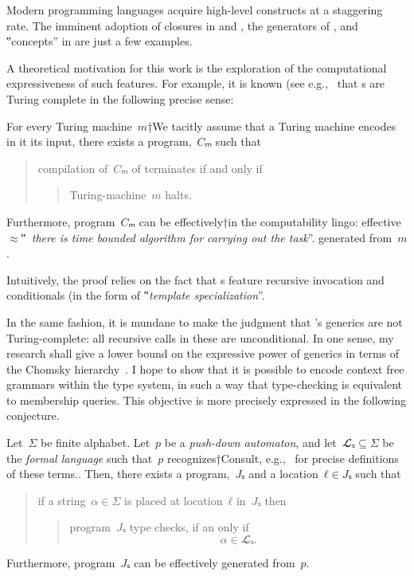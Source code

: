 Modern programming languages acquire high-level constructs
  at a staggering rate.
The imminent adoption of closures in \Java and \CC,
  the generators of \CSharp, and ‟concepts” in
  \CC are just a few examples.

A theoretical motivation for this work
  is the exploration of the computational
  expressiveness of such features.
For example, it is known (see e.g.,~\cite{Gil:Gutterman:2003} that
  s are Turing complete in the following precise sense:

\begin{Theorem}
  \label{Theorem:Gutterman}
  For every Turing machine~$m$†{We tacitly assume that a Turing machine
    encodes in it its input}, there exists a \CC program,~$Cₘ$ such that
  \begin{quote}
    compilation of~$Cₘ$ of terminates if and only if
    \begin{quote}
      Turing-machine~$m$ halts.
    \end{quote}
  \end{quote}
  Furthermore, program~$Cₘ$ can be effectively†{in the computability lingo:
    effective~$≈$‟~\emph{there is time
  bounded algorithm for carrying out the task}”.} generated from~$m$.
\end{Theorem}

Intuitively, the proof relies on the fact that s
  feature recursive invocation and conditionals (in the form of
  ‟\emph{template specialization}”.

In the same fashion, it is mundane to make the judgment that
  \Java's generics are not Turing-complete: all recursive calls
  in these are unconditional.
In one sense, my research shall give a lower bound on the
  expressive power of \Java generics in terms of the Chomsky hierarchy~\cite{Chomsky:1963}.
I hope to show that it is possible to encode context free grammars within the \Java type system,
  in such a way that type-checking is equivalent to membership queries.
This objective is more precisely expressed in the following conjecture.

\begin{Conjecture}
\label{Conjecture:Gil:Levy}
Let~$Σ$ be finite alphabet.
Let~$p$ be a \emph{push-down automaton}, and let~$𝓛ₛ⊆Σ$ be
the \emph{formal language} such that~$p$
recognizes†{Consult, e.g.,~\cite{Automatim} for precise definitions of these terms.}.
Then, there exists a \Java program,~$Jₛ$ and a location~$ℓ∈Jₛ$
such that
\begin{quote}
  if a string~$α∈Σ$ is
  placed at location~$ℓ$ in~$Jₛ$ then
  \begin{quote}
    program~$Jₛ$ type checks, if an only if
    \[
      α∈𝓛ₛ.
    \]
  \end{quote}
\end{quote}
Furthermore, program~$Jₛ$ can be effectively generated from~$p$.
\end{Conjecture}

